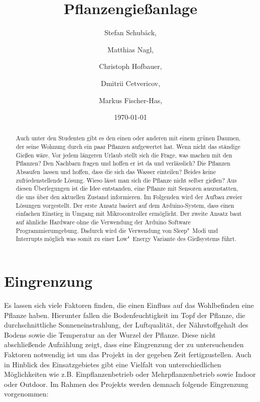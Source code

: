 \documentclass[]{IEEEtran}
\title{Pflanzengießanlage}
\date{\today}
\author{ Stefan Schubäck, \and Matthias Nagl,\and Christoph Hofbauer, \and Dmitrii Cetvericov, \and Markus Fischer-Has,}
\begin{document}
	\maketitle

\begin{abstract}
Auch unter den Studenten gibt es den einen oder anderen mit einem grünen Daumen, der seine Wohnung durch ein paar Pflanzen aufgewertet hat. 
Wenn nicht das ständige Gießen wäre. 
Vor jedem längeren Urlaub stellt sich die Frage, was machen mit den Pflanzen? 
Den Nachbarn fragen und hoffen er ist da und verlässlich? 
Die Pflanzen \glqq Absaufen\grqq \ lassen und hoffen, dass die sich das Wasser einteilen? 
Beides keine zufriedenstellende Lösung. Wieso lässt man sich die Pflanze nicht selber gießen?
Aus diesen Überlegungen ist die Idee entstanden, eine Pflanze mit Sensoren auszustatten, die uns über den aktuellen Zustand informieren. 
Im Folgenden wird der Aufbau zweier Lösungen vorgestellt. 
Der erste Ansatz basiert auf dem Arduino-System, dass einen einfachen Einstieg in Umgang mit Mikrocontroller ermöglicht. 
Der zweite Ansatz baut auf ähnliche Hardware ohne die Verwendung der Arduino Software Programmierumgebung. 
Dadurch wird die Verwendung von Sleep"~Modi und Interrupts möglich was somit zu einer Low"~Energy Variante des Gießsystems führt.  

\end{abstract}

\section{Eingrenzung}
Es lassen sich viele Faktoren finden, die einen Einfluss auf das Wohlbefinden eine Pflanze haben. 
Hierunter fallen die Bodenfeuchtigkeit im Topf der Pflanze, die durchschnittliche Sonneneinstrahlung, der Luftqualität, der Nährstoffgehalt des Bodens sowie die Temperatur an der Wurzel der Pflanze. 
Diese nicht abschließende Aufzählung zeigt, dass eine Eingrenzung der zu untersuchenden Faktoren notwendig ist um das Projekt in der gegeben Zeit fertigzustellen.
Auch in Hinblick des Einsatzgebietes gibt eine Vielfalt von unterschiedlichen Möglichkeiten wie z.B. Einpflanzenbetrieb oder Mehrpflanzenbetrieb sowie Indoor oder Outdoor. 
Im Rahmen des Projekts werden demnach folgende Eingrenzung vorgenommen:
\end{document}
